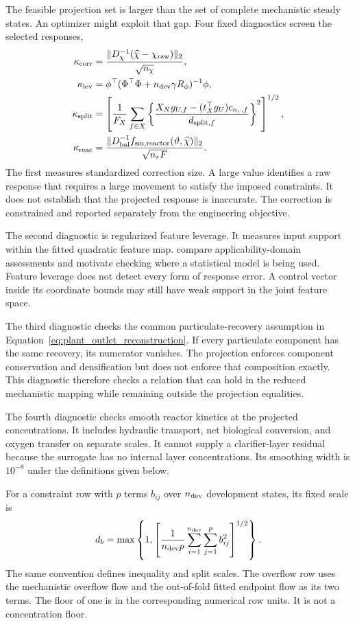 The feasible projection set is larger than the set of complete mechanistic steady states. An optimizer might exploit that gap. Four fixed diagnostics screen the selected responses,
\begin{align}
\kappa_{\rm corr}&=\frac{\|D_\chi^{-1}(\widehat\chi-\chi_{\rm raw})\|_2}{\sqrt{n_\chi}},\\
\kappa_{\rm lev}&=\phi^\top(\Phi^\top\Phi+n_{\rm dev}\gamma R_\phi)^{-1}\phi,\\
\kappa_{\rm split}&=\left[\frac1{F_X}\sum_{f\in X}
\left\{\frac{X_Ng_{U,f}-(t_X^\top g_U)c_{n_r,f}}{d_{{\rm split},f}}\right\}^2\right]^{1/2},\\
\kappa_{\rm reac}&=\frac{\|D_{\rm bal}^{-1}f_{{\rm sm},\rm reactor}(\vartheta,\widehat\chi)\|_2}{\sqrt{n_rF}}.
\label{eq:plant_trust_diagnostics}
\end{align}
The first measures standardized correction size. A large value identifies a raw response that requires a large movement to satisfy the imposed constraints. It does not establish that the projected response is inaccurate. The correction is constrained and reported separately from the engineering objective.

The second diagnostic is regularized feature leverage. It measures input support within the fitted quadratic feature map. \citet{Sahigara2012} compare applicability-domain assessments and motivate checking where a statistical model is being used. Feature leverage does not detect every form of response error. A control vector inside its coordinate bounds may still have weak support in the joint feature space.

The third diagnostic checks the common particulate-recovery assumption in Equation~\eqref{eq:plant_outlet_reconstruction}. If every particulate component has the same recovery, its numerator vanishes. The projection enforces component conservation and densification but does not enforce that composition exactly. This diagnostic therefore checks a relation that can hold in the reduced mechanistic mapping while remaining outside the projection equalities.

The fourth diagnostic checks smooth reactor kinetics at the projected concentrations. It includes hydraulic transport, net biological conversion, and oxygen transfer on separate scales. It cannot supply a clarifier-layer residual because the surrogate has no internal layer concentrations. Its smoothing width is $10^{-8}$ under the definitions given below.

For a constraint row with $p$ terms $b_{ij}$ over $n_{\rm dev}$ development states, its fixed scale is
\begin{equation}
d_b=\max\left\{1,\left[\frac1{n_{\rm dev}p}
\sum_{i=1}^{n_{\rm dev}}\sum_{j=1}^{p}b_{ij}^2\right]^{1/2}\right\}.
\label{eq:plant_term_scales}
\end{equation}
The same convention defines inequality and split scales. The overflow row uses the mechanistic overflow flow and the out-of-fold fitted endpoint flow as its two terms. The floor of one is in the corresponding numerical row units. It is not a concentration floor.

